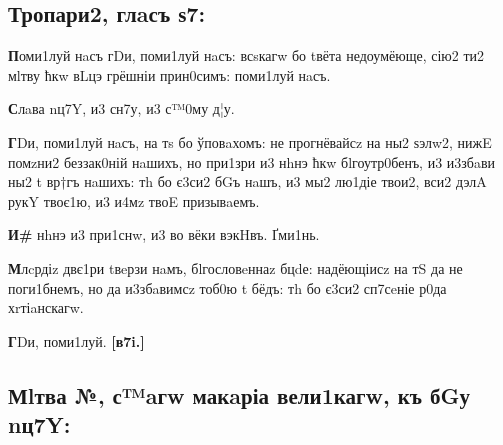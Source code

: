 \subsection[Тропари, глас 6]
{Тропари2, глaсъ ѕ7:}

\textbf{П}оми1луй нaсъ гDи, поми1луй нaсъ: всsкагw бо tвёта недоумёюще, сію2 ти2
мlтву ћкw вLцэ грёшніи прин0симъ: поми1луй нaсъ.

\textbf{С}лaва nц7Y, и3 сн7у, и3 с™0му д¦у.

\textbf{Г}Dи, поми1луй нaсъ, на тs бо ўповaхомъ: не прогнёвайсz на ны2 ѕэлw2,
нижE помzни2 беззак0ній нaшихъ, но при1зри и3 нhнэ ћкw бlгоутр0бенъ, и3
и3збaви ны2 t вр†гъ нaшихъ: тh бо є3си2 бGъ нaшъ, и3 мы2 лю1діе твои2,
вси2 дэлA рукY твоє1ю, и3 и4мz твоE призывaемъ.

\textbf{И\#} нhнэ и3 при1снw, и3 во вёки вэкHвъ. Ґми1нь.

\textbf{М}лcрдіz двє1ри tвeрзи нaмъ, бlгословeннаz бцdе: надёющіисz на тS да не
поги1бнемъ, но да и3збaвимсz тоб0ю t бёдъ: тh бо є3си2 сп7сeніе р0да
хrтіaнскагw.

\textbf{Г}Dи, поми1луй. \textbf{{[}в7i.{]}}

\subsection[Молитва 1, святаго Макария Великаго, к Богу Отцу ]
{Мlтва №, с™aгw макaріа вели1кагw, къ бGу nц7Y:}

